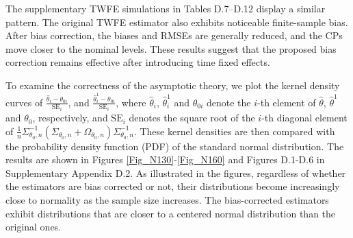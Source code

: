 \documentclass[11pt,a4paper]{article}
\begin{document}
The supplementary TWFE simulations in Tables D.7--D.12 display a similar pattern. The original TWFE estimator also exhibits noticeable finite-sample bias. After
bias correction, the biases and RMSEs are generally reduced, and the CPs move closer to the nominal levels. These results suggest that the proposed bias correction remains effective after introducing time fixed effects.



To examine the correctness of the asymptotic theory, we plot the kernel density curves of $\frac{\hat{\theta}_i-\theta_{0i}}{\mathrm{SE}_i}$, and $\frac{\hat{\theta}^1_i-\theta_{0i}}{\mathrm{SE}_i}$, where $\hat{\theta}_i$, $\hat{\theta}^1_i$ and $\theta_{0i}$ denote the $i$-th element of $\hat{\theta}$, $\hat{\theta}^1$ and $\theta_{0}$, respectively, and $\mathrm{SE}_i$ denotes the square root of the $i$-th diagonal element of $\frac{1}{n}\Sigma_{\theta_0,n}^{-1}(\Sigma_{\theta_0,n}+\Omega_{\theta_0,n})\Sigma_{\theta_0,n}^{-1}$.
These kernel densities are then compared with the probability density function (PDF) of the standard normal distribution. The results are shown in Figures \ref{Fig_N130}-\ref{Fig_N160} and Figures D.1-D.6 in Supplementary Appendix D.2. As illustrated in the figures, regardless of whether the estimators are bias corrected or not, their distributions become increasingly close to normality as the sample size increases. The bias-corrected estimators exhibit distributions that are closer to a centered normal distribution than the original ones.
\end{document}
